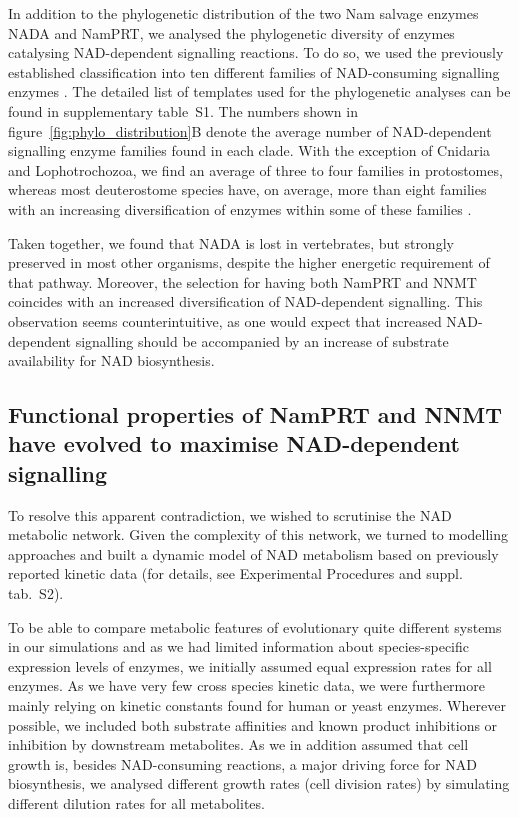 In addition to the phylogenetic distribution of the two Nam salvage enzymes NADA and NamPRT, we analysed the phylogenetic diversity of enzymes catalysing NAD-dependent signalling reactions. To do so, we used the previously established classification into ten different families of NAD-consuming signalling enzymes \cite{Gossmann2012FEBS}. The detailed list of templates used for the phylogenetic analyses can be found in supplementary table~S1. The numbers shown in figure~\ref{fig:phylo_distribution}B denote the average number of NAD-dependent signalling enzyme families found in each clade. With the exception of Cnidaria and Lophotrochozoa, we find an average of three to four families in protostomes, whereas most deuterostome species have, on average, more than eight families with an increasing diversification of enzymes within some of these families \cite{Gossmann2014DNAR}.

Taken together, we found that NADA is lost in vertebrates, but strongly preserved in most other organisms, despite the higher energetic requirement of that pathway. Moreover, the selection for having both NamPRT and NNMT coincides with an increased diversification of NAD-dependent signalling. This observation seems counterintuitive, as one would expect that increased NAD-dependent signalling should be accompanied by an increase of substrate availability for NAD biosynthesis.


\subsection{Functional properties of NamPRT and NNMT have evolved to maximise NAD-dependent signalling}

To resolve this apparent contradiction, we wished to scrutinise the NAD metabolic network. Given the complexity of this network, we turned to modelling approaches and built a dynamic model of NAD metabolism based on previously reported kinetic data (for details, see Experimental Procedures and suppl. tab.~S2).

To be able to compare metabolic features of evolutionary quite different systems in our simulations and as we had limited information about species-specific expression levels of enzymes, we initially assumed equal expression rates for all enzymes. As we have very few cross species kinetic data, we were furthermore mainly relying on kinetic constants found for human or yeast enzymes. Wherever possible, we included both substrate affinities and known product inhibitions or inhibition by downstream metabolites. As we in addition assumed that cell growth is, besides NAD-consuming reactions, a major driving force for NAD biosynthesis, we analysed different growth rates (cell division rates) by simulating different dilution rates for all metabolites.

